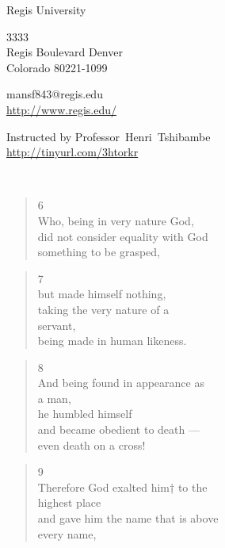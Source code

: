 \documentclass[11pt,a4paper]{scrartcl} %
\begin{document}
\pagecolor{Sepia!03}
\begin{cv}{}
        \begin{cvlist}{\textcolor{brown}{}}\label{PersDat}  
            \item   Regis University
            \item   3333\\
                    Regis Boulevard Denver \\	
                    Colorado 80221-1099
            \item   mansf843@regis.edu\\				
                    \url{http://www.regis.edu/}				
        \end{cvlist}
        \begin{cvlist}{}\label{irgendwas}
            \item Instructed by Professor~Henri~Tshibambe\\
             \url{http://tinyurl.com/3htorkr}
        \end{cvlist}
    \end{cv}
\clearpage
\noindent
\textcolor{Maroon}{}\\
\textcolor{brown}{}
\begin{verse}
6\\ Who, being in very nature God, \\ did not consider equality with God \\ something to be grasped, 
\end{verse}
\begin{verse}
7\\ but made himself nothing,\\ taking the very nature of a\\ servant, \\ being made in human likeness.
\end{verse}
\begin{verse}
8\\ And being found in appearance as\\ a man,\\he humbled himself\\ and became obedient to death —\\ even death on a cross!
\end{verse}
\begin{verse}
9\\ Therefore God exalted him† to the\\ highest place\\ and gave him the name that is above\\ every name,
\end{verse}
\end{document}
